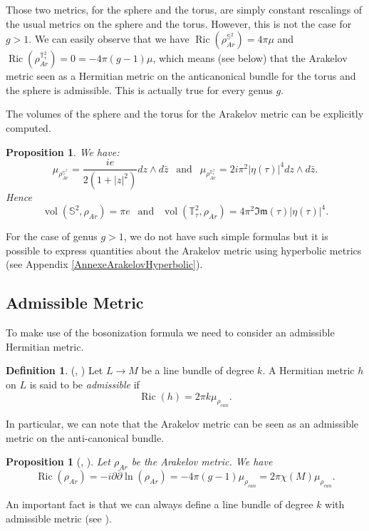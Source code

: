 \documentclass{article}
\newtheorem{Proposition}[theorem]{Proposition}
\theoremstyle{definition}
\newtheorem{Definition}[theorem]{Definition}
\theoremstyle{remark}
\DeclareMathOperator{\vol}{vol}
\DeclareMathOperator{\Ric}{Ric}
\begin{document}
Those two metrics, for the sphere and the torus, are simply constant rescalings of the usual metrics on the sphere and the torus. However, this is not the case for $g>1$.
We can easily observe that we have $\Ric(\rho_{Ar}^{\mathbb{S}^{2}}) = 4\pi \mu$ and $\Ric(\rho_{Ar}^{\mathbb{T}^{2}_{\tau}}) = 0 = -4\pi (g-1) \mu$, which means (see below) that the Arakelov metric seen as a Hermitian metric on the anticanonical bundle for the torus and the sphere is admissible. This is actually true for every genus $g$.

The volumes of the sphere and the torus for the Arakelov metric can be explicitly computed. 
\begin{Proposition}\label{Prop:VolumeArakelov}
    We have: $$\mu_{\rho_{Ar}^{\mathbb{S^{2}}}}=\frac{ie}{2(1+|z|^{2})}dz\wedge d\bar{z} ~~ \text{ and } ~~ \mu_{\rho_{Ar}^{\mathbb{T^{2}_{\tau}}}}=2i\pi^{2}|\eta(\tau)|^{4}dz\wedge d\bar{z}.$$ Hence 
    \[
    \vol(\mathbb{S}^2,\rho_{Ar}) = \pi e
    ~~
    \text{ and } ~~
    \vol(\mathbb{T}^2_{\tau},\rho_{Ar}) = 4\pi^2 \mathfrak{Im}(\tau) |\eta(\tau)|^4.
    \]
\end{Proposition}


For the case of genus $g>1$, we do not have such simple formulas but it is possible to express quantities about the Arakelov metric using hyperbolic metrics (see Appendix \ref{AnnexeArakelovHyperbolic}).
\subsection{Admissible Metric}
To make use of the bosonization formula we need to consider an admissible Hermitian metric.
\begin{Definition}\label{Def:MétAdm} (\cite[eq. (4.3)]{WentworthGluing}, \cite[p.17]{Fay1992KernelFA})
    Let $L \to M$ be a line bundle of degree $k$. A Hermitian metric $h$ on $L$ is said to be \emph{admissible} if
    \[
    \Ric(h) = 2\pi k \mu_{\rho_{can}}.
    \]
\end{Definition}
In particular, we can note that the Arakelov metric can be seen as an admissible metric on the anti-canonical bundle.
\begin{Proposition}[{\cite[eq. (4.4)]{WentworthGluing}}, {\cite[eq. (1.33)]{Fay1992KernelFA}}]
    Let $\rho_{Ar}$ be the Arakelov metric. We have
    \[
    \Ric(\rho_{Ar}) = -i\partial \bar{\partial} \ln(\rho_{Ar}) = -4\pi (g-1) \mu_{\rho_{can}}=2\pi\chi(M)\mu_{\rho_{can}}.
    \]
\end{Proposition}

An important fact is that we can always define a line bundle of degree $k$ with admissible metric (see \cite{FaltingsCalculusArithmeticSurface1984,Fay1992KernelFA}).
\end{document}
